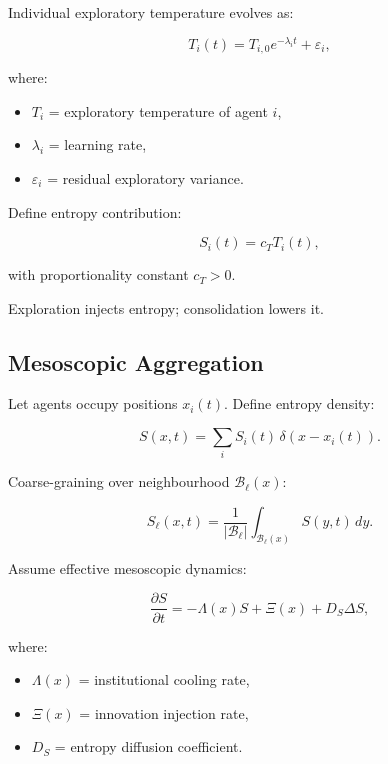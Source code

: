 \documentclass[12pt,a4paper]{article}
\theoremstyle{definition}
\begin{document}
Individual exploratory temperature evolves as:

\begin{equation}
  T_i(t)
  =
  T_{i,0} e^{-\lambda_i t}
  + \varepsilon_i,
  \label{eq:micro_anneal}
\end{equation}

where:

\begin{itemize}
  \item $T_i$ = exploratory temperature of agent $i$,
  \item $\lambda_i$ = learning rate,
  \item $\varepsilon_i$ = residual exploratory variance.
\end{itemize}

Define entropy contribution:

\begin{equation}
  S_i(t) = c_T T_i(t),
\end{equation}

with proportionality constant $c_T > 0$.

Exploration injects entropy; consolidation lowers it.

\subsection{Mesoscopic Aggregation}

Let agents occupy positions $x_i(t)$.
Define entropy density:

\begin{equation}
  S(x,t)
  =
  \sum_i S_i(t)\,
  \delta(x - x_i(t)).
\end{equation}

Coarse-graining over neighbourhood $\mathcal{B}_\ell(x)$:

\begin{equation}
  S_\ell(x,t)
  =
  \frac{1}{|\mathcal{B}_\ell|}
  \int_{\mathcal{B}_\ell(x)}
  S(y,t)\, dy.
\end{equation}

Assume effective mesoscopic dynamics:

\begin{equation}
  \frac{\partial S}{\partial t}
  =
  -\Lambda(x) S
  + \Xi(x)
  + D_S \Delta S,
  \label{eq:macro_entropy}
\end{equation}

where:

\begin{itemize}
  \item $\Lambda(x)$ = institutional cooling rate,
  \item $\Xi(x)$ = innovation injection rate,
  \item $D_S$ = entropy diffusion coefficient.
\end{itemize}
\end{document}
